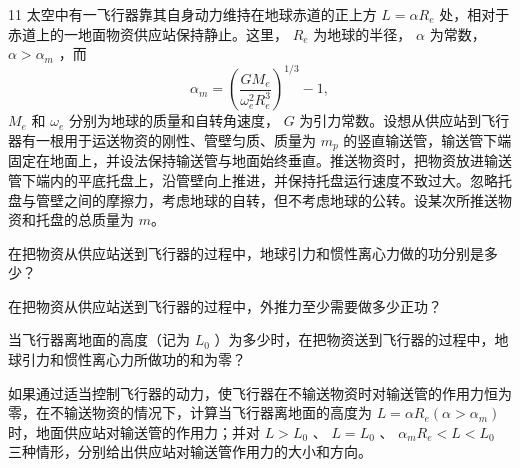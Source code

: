 \begin{problem}[第30届全国中学生物理竞赛决赛][太空物资输送与引力离心力做功]{11}
太空中有一飞行器靠其自身动力维持在地球赤道的正上方 $L = \alpha R_{e}$ 处，相对于赤道上的一地面物资供应站保持静止。这里， $R_{e}$ 为地球的半径， $\alpha$ 为常数， $\alpha >\alpha_{m}$ ，而
\begin{equation*}
\alpha_ {m} = \left(\frac {G M _ {e}}{\omega_ {e} ^ {2} R _ {e} ^ {3}}\right) ^ {1 / 3} - 1,
\end{equation*}
$M_{e}$ 和 $\omega_{e}$ 分别为地球的质量和自转角速度， $G$ 为引力常数。设想从供应站到飞行器有一根用于运送物资的刚性、管壁匀质、质量为 $m_{p}$ 的竖直输送管，输送管下端固定在地面上，并设法保持输送管与地面始终垂直。推送物资时，把物资放进输送管下端内的平底托盘上，沿管壁向上推进，并保持托盘运行速度不致过大。忽略托盘与管壁之间的摩擦力，考虑地球的自转，但不考虑地球的公转。设某次所推送物资和托盘的总质量为 $m$。
\begin{subproblem}
在把物资从供应站送到飞行器的过程中，地球引力和惯性离心力做的功分别是多少？
\end{subproblem}
\begin{subproblem}
在把物资从供应站送到飞行器的过程中，外推力至少需要做多少正功？
\end{subproblem}
\begin{subproblem}
当飞行器离地面的高度（记为 $L_{0}$ ）为多少时，在把物资送到飞行器的过程中，地球引力和惯性离心力所做功的和为零？
\end{subproblem}
\begin{subproblem}
如果通过适当控制飞行器的动力，使飞行器在不输送物资时对输送管的作用力恒为零，在不输送物资的情况下，计算当飞行器离地面的高度为 $L = \alpha R_{e} (\alpha > \alpha_{m})$ 时，地面供应站对输送管的作用力；并对 $L > L_{0}$ 、 $L = L_{0}$ 、 $\alpha_{m} R_{e} < L < L_{0}$ 三种情形，分别给出供应站对输送管作用力的大小和方向。
\end{subproblem}
\end{problem}